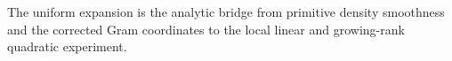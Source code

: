 The uniform expansion is the analytic bridge from primitive density smoothness and the corrected Gram coordinates to the local linear and growing-rank quadratic experiment.